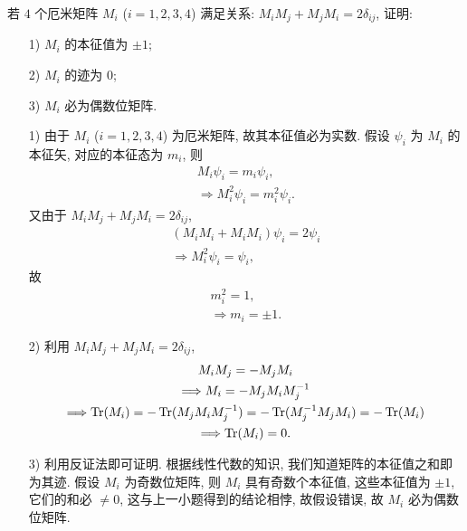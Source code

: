 \documentclass{assignment}
\begin{document}
\begin{prob}
    若 $4$ 个厄米矩阵 $M_i$ ($i=1,2,3,4$) 满足关系: $M_iM_j+M_jM_i=2\delta_{ij}$, 证明:
    \begin{itemize}
        \item[1)] $M_i$ 的本征值为 $\pm 1$;
        \item[2)] $M_i$ 的迹为 $0$;
        \item[3)] $M_i$ 必为偶数位矩阵.
    \end{itemize}
\end{prob}
\begin{pf}
    \begin{itemize}
        \item[1)] 由于 $M_i$ ($i=1,2,3,4$) 为厄米矩阵, 故其本征值必为实数. 假设 $\psi_i$ 为 $M_i$ 的本征矢, 对应的本征态为 $m_i$, 则
        \begin{gather}
            M_i\psi_i=m_i\psi_i,\\
            \Longrightarrow M_i^2\psi_i=m_i^2\psi_i.
        \end{gather}
        又由于 $M_iM_j+M_jM_i=2\delta_{ij}$,
        \begin{gather}
            (M_iM_i+M_iM_i)\psi_i=2\psi_i\\
            \Longrightarrow M_i^2\psi_i=\psi_i,
        \end{gather}
        故
        \begin{gather}
            m_i^2=1,\\
            \Longrightarrow m_i=\pm 1.
        \end{gather}
        \item[2)] 利用 $M_iM_j+M_jM_i=2\delta_{ij}$,
        \begin{gather}
            M_iM_j=-M_jM_i\\
            \Longrightarrow M_i=-M_jM_iM_j^{-1}\\
            \Longrightarrow\operatorname{Tr}(M_i)=-\operatorname{Tr}(M_jM_iM_j^{-1})=-\operatorname{Tr}(M_j^{-1}M_jM_i)=-\operatorname{Tr}(M_i)\\
            \Longrightarrow\operatorname{Tr}(M_i)=0.
        \end{gather}
        \item[3)] 利用反证法即可证明. 根据线性代数的知识, 我们知道矩阵的本征值之和即为其迹. 假设 $M_i$ 为奇数位矩阵, 则 $M_i$ 具有奇数个本征值, 这些本征值为 $\pm 1$, 它们的和必 $\neq 0$, 这与上一小题得到的结论相悖, 故假设错误, 故 $M_i$ 必为偶数位矩阵.
    \end{itemize}
\end{pf}
\end{document}

